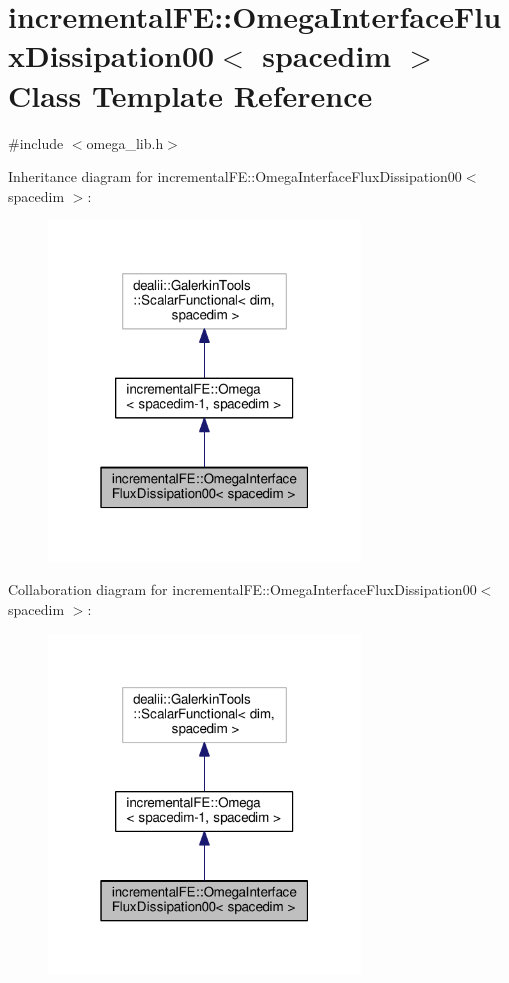 \hypertarget{classincremental_f_e_1_1_omega_interface_flux_dissipation00}{}\section{incremental\+FE\+:\+:Omega\+Interface\+Flux\+Dissipation00$<$ spacedim $>$ Class Template Reference}
\label{classincremental_f_e_1_1_omega_interface_flux_dissipation00}


{\ttfamily \#include $<$omega\+\_\+lib.\+h$>$}



Inheritance diagram for incremental\+FE\+:\+:Omega\+Interface\+Flux\+Dissipation00$<$ spacedim $>$\+:\nopagebreak
\begin{figure}[H]
\begin{center}
\leavevmode
\includegraphics[width=235pt]{classincremental_f_e_1_1_omega_interface_flux_dissipation00__inherit__graph}
\end{center}
\end{figure}


Collaboration diagram for incremental\+FE\+:\+:Omega\+Interface\+Flux\+Dissipation00$<$ spacedim $>$\+:\nopagebreak
\begin{figure}[H]
\begin{center}
\leavevmode
\includegraphics[width=235pt]{classincremental_f_e_1_1_omega_interface_flux_dissipation00__coll__graph}
\end{center}
\end{figure}
